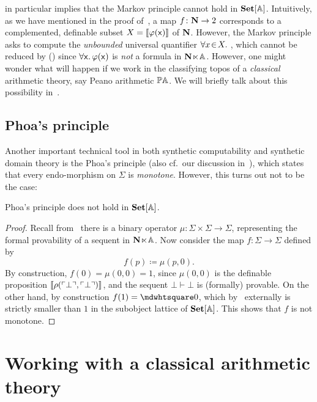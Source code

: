 \begin{remark}\label{rem:failureofmarkov}
   in particular implies that the Markov principle cannot hold in $\mathbf{Set}[\mathbb{A}]$. Intuitively, as we have mentioned in the proof of~, a map $f \colon \mathbf N \to 2$ corresponds to a complemented, definable subset $X = \llbracket\varphi(\mathsf{x})\rrbracket$ of $\mathbf N$. However, the Markov principle asks to compute the \emph{unbounded} universal quantifier $\forall x\!\in\!X.\ $, which cannot be reduced by (\AxiomSQCA) since $\forall\mathsf{x}.\,\varphi(\mathsf{x})$ is \emph{not} a formula in $\mathbf N\hspace{-.4ex}\ltimes\hspace{-.4ex}\mathbb{A}$. However, one might wonder what will happen if we work in the classifying topos of a \emph{classical} arithmetic theory, say Peano arithmetic $\mathbb{PA}$. We will briefly talk about this possibility in~.
\end{remark}

\subsection{Phoa's principle}

Another important technical tool in both synthetic computability and synthetic domain theory is the Phoa's principle (also cf.\ our discussion in~), which states that every endo-morphism on $\Sigma$ is \emph{monotone}. However, this turns out not to be the case:

\begin{proposition}\label{prop:failofphoa}
  Phoa's principle does not hold in $\mathbf{Set}[\mathbb{A}]$.
\end{proposition}
\begin{proof}
  Recall from~ there is a binary operator $\mu \colon \Sigma \times \Sigma \to \Sigma$, representing the formal provability of a sequent in $\mathbf N\hspace{-.4ex}\ltimes\hspace{-.4ex}\mathbb{A}$. Now consider the map $f \colon \Sigma \to \Sigma$ defined by 
  \[ f(p) \coloneq \mu(p,0). \]
  By construction, $f(0) = \mu(0,0) = 1$, since $\mu(0,0)$ is the definable proposition $\llbracket\rho(\ulcorner \bot \urcorner,\ulcorner \bot \urcorner)\rrbracket$, and the sequent $\bot \vdash \bot$ is (formally) provable. On the other hand, by construction $f(1) = \bx 0$, which by~ externally is strictly smaller than $1$ in the subobject lattice of $\mathbf{Set}[\mathbb{A}]$. This shows that $f$ is not monotone.
\end{proof}

\section{Working with a classical arithmetic theory}\label{sec:classicalarithmetic}

